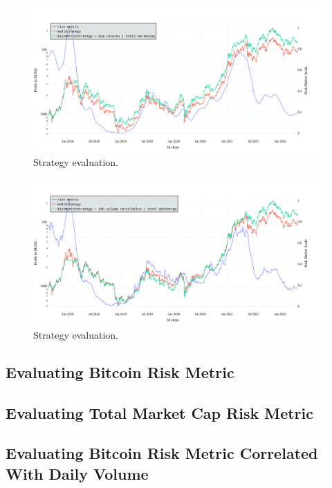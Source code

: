 \begin{figure}[!hbt]
    \centering
    \includegraphics[width=\columnwidth]{figures/strat-eval2.png}
    \caption{Strategy evaluation.}
    \label{figure-strat-eval}
\end{figure}

\begin{figure}[!hbt]
    \centering
    \includegraphics[width=\columnwidth]{figures/strat-eval3.png}
    \caption{Strategy evaluation.}
    \label{figure-strat-eval}
\end{figure}

\subsection*{Evaluating Bitcoin Risk Metric}

\subsection*{Evaluating Total Market Cap Risk Metric}

\subsection*{Evaluating Bitcoin Risk Metric Correlated With Daily Volume}

